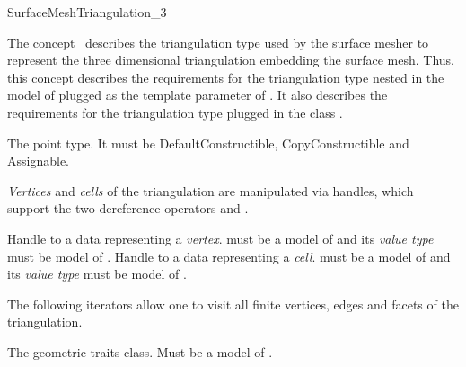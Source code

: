 \begin{ccRefConcept}{SurfaceMeshTriangulation_3}

\ccDefinition

The concept \ccRefName\  describes 
the triangulation type used by the surface mesher 
  to represent 
the three dimensional triangulation
embedding the surface mesh.
Thus, this  concept describes the requirements
for the triangulation type 
nested in the model of 
plugged as the template parameter  of
. It also describes
the requirements for the triangulation type
plugged in the class
.




\ccTypes

{The point type. It must be DefaultConstructible, CopyConstructible and
  Assignable.}

\emph{Vertices} and \emph{cells} of the triangulation are manipulated via
handles, which support the two dereference operators  and
.

{Handle to a data representing a \emph{vertex}.  must be
  a model of  and its \emph{value type} must be model of
  .}
\ccGlue
{}
{Handle to a data representing a \emph{cell}.  must be a
  model of  and its \emph{value type} must be model of
  .}

\ccGlue
{}

The following iterators allow one to visit all finite vertices, edges and
facets of the triangulation.

\ccGlue
{}
\ccGlue
{}

{The geometric traits class. Must be a model of
.}


\ccCreation
{}  %


\end{ccRefConcept}
